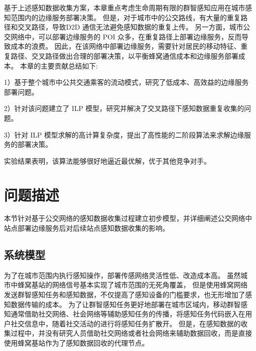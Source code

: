 基于上述感知数据收集方案，本章重点考虑生命周期有限的群智感知应用在城市感知范围内的边缘服务部署决策。
但是，对于城市中的公交路线，有大量的重复路径和交叉路径，导致D2D 通信无法避免感知数据的重复上传。
另一方面，城市公交网络中，可以部署边缘服务的 POI 众多，在重复路径上部署边缘服务，反而导致成本的浪费。
因此，在该网络中部署边缘服务，需要针对居民的移动特征、重复路径、交叉路径做出合理的部署决策，以平衡蜂窝通信成本和边缘服务部署成本。
本章的主要贡献总结如下:

1）基于整个城市中公共交通乘客的流动模式，研究了低成本、高效益的边缘服务部署问题。

2）针对该问题建立了 ILP 模型，研究并解决了交叉路径下感知数据重复收集的问题。

3）针对 ILP 模型求解的高计算复杂度，提出了高性能的二阶段算法来求解边缘服务的部署决策。

实验结果表明，该算法能够很好地逼近最优解，优于其他竞争对手。



\section{问题描述}
\label{Sec_Monet_question}

本节针对基于公交网络的感知数据收集过程建立初步模型，并详细阐述公交网络中站点部署边缘服务后对后续站点感知数据收集的影响。

\subsection{系统模型}

为了在城市范围内执行感知操作，部署传感网络灵活性低、改造成本高。
虽然城市中蜂窝基站的网络信号基本实现了城市范围的无死角覆盖，
但是使用蜂窝网络发送群智感知任务和感知数据，不仅提高了感知设备的门槛要求，也无形增加了感知数据传输的成本。
为了让群智感知任务更好地部署在城市区域内，移动群智感知通常借助社交网络、社会网络等辅助感知任务的传播，将感知任务代码嵌入在用户社交信息中，随着社交活动的进行将感知任务扩散开。
但是，在感知数据的收集过程中，并没有研究人员借助社交网络或者社会网络来辅助数据回收，而是直接使用蜂窝基站作为了感知数据回收的代理节点。

